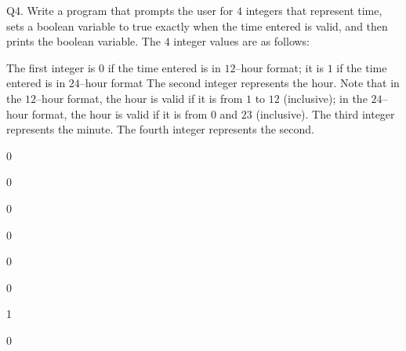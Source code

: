 Q4. Write a program that prompts the user for $4$ integers that represent time,
sets a boolean variable to true exactly when the time entered is valid, and
then prints the boolean variable. The $4$ integer values are as follows:
\begin{itemize}
  \li The first integer is $0$ if the time entered is in $12$--hour format; it
      is $1$ if the time entered is in $24$--hour format
  \li The second integer represents the hour. Note that in the $12$--hour
      format, the hour is valid if it is 
      from $1$ to  $12$ (inclusive); 
      in the
      $24$--hour format, the hour is valid if it is 
      from $0$ and $23$ (inclusive).
  \li The third integer represents the minute. 
  \li The fourth integer represents the second.
\end{itemize}

\resett
\nextt
\begin{console}[commandchars=\\\{\}]
0
\end{console}

\nextt
\begin{console}[commandchars=\\\{\}]
0
\end{console}

\nextt
\begin{console}[commandchars=\\\{\}]
0
\end{console}

\nextt
\begin{console}[commandchars=\\\{\}]
0
\end{console}

\nextt
\begin{console}[commandchars=\\\{\}]
0
\end{console}

\nextt
\begin{console}[commandchars=\\\{\}]
0
\end{console}

\nextt
\begin{console}[commandchars=\\\{\}]
1
\end{console}

\nextt
\begin{console}[commandchars=\\\{\}]
0
\end{console}

